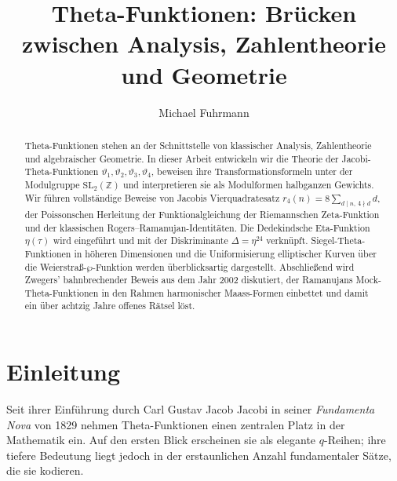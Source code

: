 \documentclass[12pt,a4paper]{amsart}
\author{Michael Fuhrmann}
\theoremstyle{definition}
\begin{document}
\title{Theta-Funktionen: Brücken zwischen Analysis, Zahlentheorie und Geometrie}

\begin{abstract}
Theta-Funktionen stehen an der Schnittstelle von klassischer Analysis, Zahlentheorie
und algebraischer Geometrie.
In dieser Arbeit entwickeln wir die Theorie der Jacobi-Theta-Funktionen
$\vartheta_1, \vartheta_2, \vartheta_3, \vartheta_4$,
beweisen ihre Transformationsformeln unter der Modulgruppe $\mathrm{SL}_2(\mathbb{Z})$
und interpretieren sie als Modulformen halbganzen Gewichts.
Wir führen vollständige Beweise von Jacobis Vierquadratesatz
$r_4(n) = 8\sum_{d \mid n,\, 4 \nmid d} d$,
der Poissonschen Herleitung der Funktionalgleichung der Riemannschen Zeta-Funktion
und der klassischen Rogers--Ramanujan-Identitäten.
Die Dedekindsche Eta-Funktion $\eta(\tau)$ wird eingeführt und mit der Diskriminante
$\Delta = \eta^{24}$ verknüpft.
Siegel-Theta-Funktionen in höheren Dimensionen und die Uniformisierung elliptischer
Kurven über die Weierstraß-$\wp$-Funktion werden überblicksartig dargestellt.
Abschließend wird Zwegers' bahnbrechender Beweis aus dem Jahr 2002 diskutiert,
der Ramanujans Mock-Theta-Funktionen in den Rahmen harmonischer Maass-Formen einbettet
und damit ein über achtzig Jahre offenes Rätsel löst.
\end{abstract}

\maketitle

\tableofcontents

\section{Einleitung}

Seit ihrer Einführung durch Carl Gustav Jacob Jacobi in seiner
\textit{Fundamenta Nova} von 1829 \cite{Jacobi1829}
nehmen Theta-Funktionen einen zentralen Platz in der Mathematik ein.
Auf den ersten Blick erscheinen sie als elegante $q$-Reihen;
ihre tiefere Bedeutung liegt jedoch in der erstaunlichen Anzahl fundamentaler Sätze,
die sie kodieren.
\end{document}
